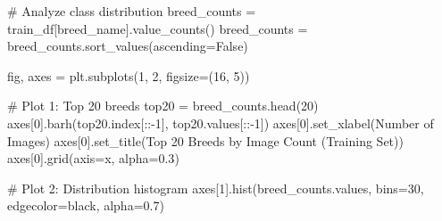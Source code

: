 \documentclass[
  letterpaper,
  DIV=11,
  numbers=noendperiod]{scrartcl}
\newenvironment{Shaded}{\begin{snugshade}}{\end{snugshade}}
\newcommand{\CommentTok}[1]{\textcolor[rgb]{0.37,0.37,0.37}{#1}}
\newcommand{\DecValTok}[1]{\textcolor[rgb]{0.68,0.00,0.00}{#1}}
\newcommand{\FloatTok}[1]{\textcolor[rgb]{0.68,0.00,0.00}{#1}}
\newcommand{\NormalTok}[1]{\textcolor[rgb]{0.00,0.23,0.31}{#1}}
\newcommand{\OperatorTok}[1]{\textcolor[rgb]{0.37,0.37,0.37}{#1}}
\newcommand{\StringTok}[1]{\textcolor[rgb]{0.13,0.47,0.30}{#1}}
\newcommand{\VariableTok}[1]{\textcolor[rgb]{0.07,0.07,0.07}{#1}}
\renewenvironment{Shaded}{%
  \begin{tcolorbox}[%
    enhanced,%
    colback=codebg,%
    colframe=codebg,%
    borderline west={3pt}{0pt}{sectionblue},%
    boxrule=0pt,%
    arc=0pt,%
    boxsep=5pt,%
    left=2mm,%
    right=2mm,%
    top=2mm,%
    bottom=2mm%
  ]%
}{%
  \end{tcolorbox}%
}
\begin{document}
\begin{Shaded}
\begin{Highlighting}[]
\CommentTok{\# Analyze class distribution}
\NormalTok{breed\_counts }\OperatorTok{=}\NormalTok{ train\_df[}\StringTok{\textquotesingle{}breed\_name\textquotesingle{}}\NormalTok{].value\_counts()}
\NormalTok{breed\_counts }\OperatorTok{=}\NormalTok{ breed\_counts.sort\_values(ascending}\OperatorTok{=}\VariableTok{False}\NormalTok{)}

\NormalTok{fig, axes }\OperatorTok{=}\NormalTok{ plt.subplots(}\DecValTok{1}\NormalTok{, }\DecValTok{2}\NormalTok{, figsize}\OperatorTok{=}\NormalTok{(}\DecValTok{16}\NormalTok{, }\DecValTok{5}\NormalTok{))}

\CommentTok{\# Plot 1: Top 20 breeds}
\NormalTok{top20 }\OperatorTok{=}\NormalTok{ breed\_counts.head(}\DecValTok{20}\NormalTok{)}
\NormalTok{axes[}\DecValTok{0}\NormalTok{].barh(top20.index[::}\OperatorTok{{-}}\DecValTok{1}\NormalTok{], top20.values[::}\OperatorTok{{-}}\DecValTok{1}\NormalTok{])}
\NormalTok{axes[}\DecValTok{0}\NormalTok{].set\_xlabel(}\StringTok{\textquotesingle{}Number of Images\textquotesingle{}}\NormalTok{)}
\NormalTok{axes[}\DecValTok{0}\NormalTok{].set\_title(}\StringTok{\textquotesingle{}Top 20 Breeds by Image Count (Training Set)\textquotesingle{}}\NormalTok{)}
\NormalTok{axes[}\DecValTok{0}\NormalTok{].grid(axis}\OperatorTok{=}\StringTok{\textquotesingle{}x\textquotesingle{}}\NormalTok{, alpha}\OperatorTok{=}\FloatTok{0.3}\NormalTok{)}

\CommentTok{\# Plot 2: Distribution histogram}
\NormalTok{axes[}\DecValTok{1}\NormalTok{].hist(breed\_counts.values, bins}\OperatorTok{=}\DecValTok{30}\NormalTok{, }
\NormalTok{             edgecolor}\OperatorTok{=}\StringTok{\textquotesingle{}black\textquotesingle{}}\NormalTok{, alpha}\OperatorTok{=}\FloatTok{0.7}\NormalTok{)}


\end{Highlighting}
\end{Shaded}
\end{document}
